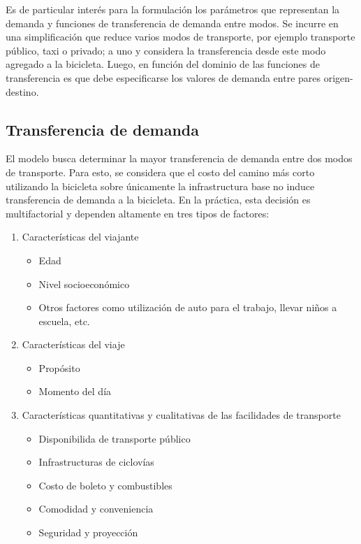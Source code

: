 \documentclass{article}
\begin{document}
  Es de particular interés para la formulación los parámetros que representan la demanda y funciones de transferencia de demanda entre modos. Se incurre en una simplificación que reduce varios modos de transporte, por ejemplo transporte público, taxi o privado; a uno y considera la transferencia desde este modo agregado a la bicicleta. Luego, en función del dominio de las funciones de transferencia es que debe especificarse los valores de demanda entre pares origen-destino.

  \subsection*{Transferencia de demanda}

  El modelo busca determinar la mayor transferencia de demanda entre dos modos de transporte. Para esto, se considera que el costo del camino más corto utilizando la bicicleta sobre únicamente la infrastructura base no induce transferencia de demanda a la bicicleta. En la práctica, esta decisión es multifactorial y dependen altamente en tres tipos de factores:

  \begin{enumerate}
    \item{
        Características del viajante
          \begin{itemize}
            \item{Edad}
            \item{Nivel socioeconómico}
            \item{Otros factores como utilización de auto para el trabajo, llevar niños a escuela, etc.}
          \end{itemize}
    }
    \item{
        Características del viaje
          \begin{itemize}
            \item{Propósito}
            \item{Momento del día}
          \end{itemize}
    }
    \item{
        Características quantitativas y cualitativas de las facilidades de transporte
        \begin{itemize}
            \item{Disponibilida de transporte público}
            \item{Infrastructuras de ciclovías}
            \item{Costo de boleto y combustibles}
            \item{Comodidad y conveniencia}
            \item{Seguridad y proyección}
        \end{itemize}
    }
  \end{enumerate}
\end{document}
